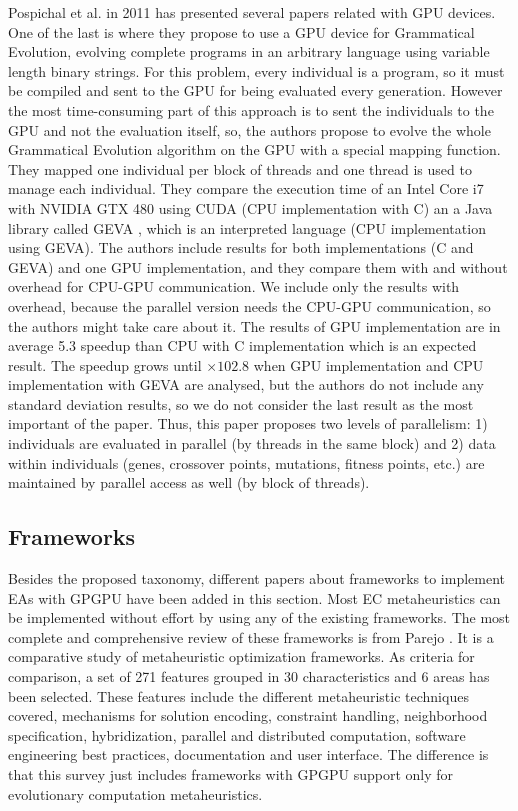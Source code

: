 \documentclass[Afour,sageh,times]{sagej}
\begin{document}
Pospichal et al. in 2011 has presented several papers related with GPU devices. One of the last is \citep{DBLP:conf/gecco/PospichalMOSJ11} where they propose to use a GPU device for Grammatical Evolution, evolving complete programs in an arbitrary language using variable length binary strings. For this problem, every individual is a program, so it must be compiled and sent to the GPU for being evaluated every generation. However the most time-consuming part of this approach is to sent the individuals to the GPU and not the evaluation itself, so, the authors propose to evolve the whole Grammatical Evolution algorithm on the GPU with a special mapping function. They mapped one individual per block of threads and one thread is used to manage each individual. They compare the execution time of an Intel Core i7 with NVIDIA GTX 480 using CUDA (CPU implementation with C) an a Java library called GEVA \citep{O'Neill:2008:GGE:1527063.1527066}, which is an interpreted language (CPU implementation using GEVA).  The authors include results for both implementations (C and GEVA) and one GPU implementation, and they compare them with and without overhead for CPU-GPU communication. We include only the results with overhead, because the parallel version needs the CPU-GPU communication, so the authors might take care about it. The results of GPU implementation are in average 5.3 speedup than CPU with C implementation which is an expected result. The speedup grows until $\times102.8$ when GPU implementation and CPU implementation with GEVA are analysed, but the authors do not include any standard deviation results, so we do not consider the last result as the most important of the paper. Thus, this paper proposes two levels of parallelism: 1) individuals are evaluated in parallel (by threads in the same block) and 2) data within individuals (genes, crossover points, mutations, fitness points, etc.) are maintained by parallel access as well (by block of threads).

\subsection{Frameworks}

Besides the proposed taxonomy, different papers about frameworks to implement EAs with GPGPU have been added in this section. %
Most EC metaheuristics can be implemented without effort by using any of the existing frameworks. The most complete and comprehensive review of these frameworks is from Parejo \citep{springerlink:10.1007/s00500-011-0754-8}. It is a comparative study of metaheuristic optimization frameworks. As criteria for comparison, a set of 271 features grouped in 30 characteristics and 6 areas has been selected. These features include the different metaheuristic techniques covered, mechanisms for solution encoding, constraint handling, neighborhood specification, hybridization, parallel and distributed computation, software engineering best practices, documentation and user interface. The difference is that this survey just includes frameworks with GPGPU support only for evolutionary computation metaheuristics. 
\end{document}
